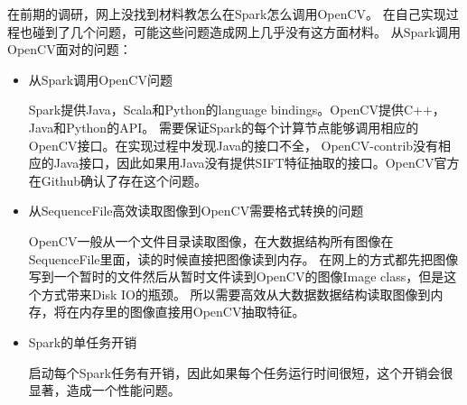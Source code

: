 在前期的调研，网上没找到材料教怎么在Spark怎么调用OpenCV。
在自己实现过程也碰到了几个问题，可能这些问题造成网上几乎没有这方面材料。
从Spark调用OpenCV面对的问题：
\begin{itemize}
  \item 从Spark调用OpenCV问题

        Spark提供Java，Scala和Python的language bindings。OpenCV提供C++，Java和Python的API。
        需要保证Spark的每个计算节点能够调用相应的OpenCV接口。在实现过程中发现Java的接口不全，
        OpenCV-contrib没有相应的Java接口，因此如果用Java没有提供SIFT特征抽取的接口。OpenCV官方
        在Github确认了存在这个问题。
  \item 从SequenceFile高效读取图像到OpenCV需要格式转换的问题

        OpenCV一般从一个文件目录读取图像，在大数据结构所有图像在SequenceFile里面，读的时候直接把图像读到内存。
        在网上的方式都先把图像写到一个暂时的文件然后从暂时文件读到OpenCV的图像Image class，但是这个方式带来Disk IO的瓶颈。
        所以需要高效从大数据数据结构读取图像到内存，将在内存里的图像直接用OpenCV抽取特征。

  \item Spark的单任务开销

        启动每个Spark任务有开销，因此如果每个任务运行时间很短，这个开销会很显著，造成一个性能问题。
\end{itemize}

